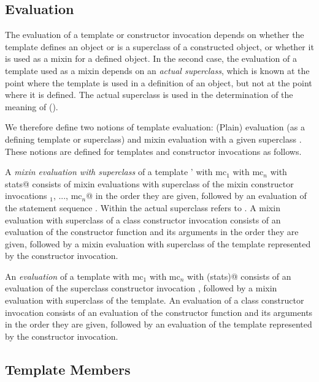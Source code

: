 \documentclass[11pt]{report}
\begin{document}
\subsection{Evaluation}

The evaluation of a template or constructor invocation depends on
whether the template defines an object or is a superclass of a
constructed object, or whether it is used as a mixin for a defined
object.  In the second case, the evaluation of a template used as a
mixin depends on an {\em actual superclass}, which is known at the
point where the template is used in a definition of an object, but not
at the point where it is defined. The actual superclass is used in the
determination of the meaning of \verb@super@ ().

We therefore define two notions of template evaluation: (Plain)
evaluation (as a defining template or superclass) and mixin evaluation
with a given superclass \verb@sc@. These notions are defined for templates
and constructor invocations as follows.

A {\em mixin evaluation with superclass \verb@sc@} of a template
\verb@sc' with mc$_1$ with mc$_n$ with {stats}@ consists of mixin
evaluations with superclass \verb@sc@ of the mixin constructor invocations
\verb@mc$_1$, ..., mc$_n$@ in the order they are given, followed by an
evaluation of the statement sequence \verb@stats@.  Within \verb@stats@ the
actual superclass refers to \verb@sc@.  A mixin evaluation with superclass
\verb@sc@ of a class constructor invocation \verb@ci@ consists of an evaluation
of the constructor function and its arguments in the order they are
given, followed by a mixin evaluation with superclass \verb@sc@ of the
template represented by the constructor invocation.

An {\em evaluation} of a template
\verb@sc with mc$_1$ with mc$_n$ with (stats)@ consists of an evaluation of
the superclass constructor invocation \verb@sc@,
followed by a mixin evaluation with superclass \verb@sc@ of the template. An
evaluation of a class constructor invocation \verb@ci@ consists of an
evaluation of the constructor function and its arguments in
the order they are given, followed by an evaluation of the template
represented by the constructor invocation.

\subsection{Template Members}

\label{sec:members}
\end{document}
